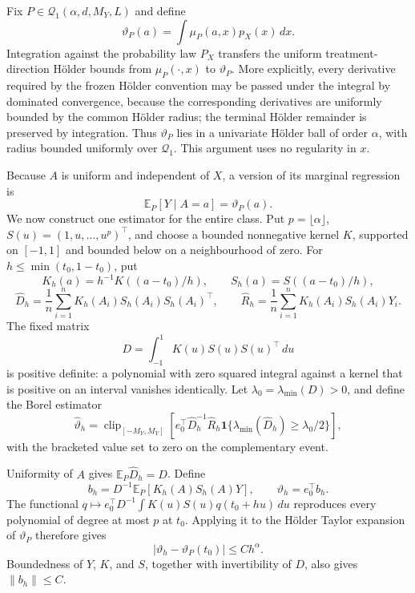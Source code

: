 Fix \(P\in\mathcal Q_1(\alpha,d,M_Y,L)\) and define
\[
\vartheta_P(a)=\int\mu_P(a,x)p_X(x)\,dx.
\]
Integration against the probability law \(P_X\) transfers the uniform treatment-direction H\"older bounds from \(\mu_P(\cdot,x)\) to \(\vartheta_P\). More explicitly, every derivative required by the frozen H\"older convention may be passed under the integral by dominated convergence, because the corresponding derivatives are uniformly bounded by the common H\"older radius; the terminal H\"older remainder is preserved by integration. Thus \(\vartheta_P\) lies in a univariate H\"older ball of order \(\alpha\), with radius bounded uniformly over \(\mathcal Q_1\). This argument uses no regularity in \(x\).

Because \(A\) is uniform and independent of \(X\), a version of its marginal regression is
\[
\mathbb E_P[Y\mid A=a]=\vartheta_P(a).
\]
We now construct one estimator for the entire class. Put \(p=\lfloor\alpha\rfloor\), \(S(u)=(1,u,\ldots,u^p)^\top\), and choose a bounded nonnegative kernel \(K\), supported on \([-1,1]\) and bounded below on a neighbourhood of zero. For \(h\le\min(t_0,1-t_0)\), put
\[
K_h(a)=h^{-1}K((a-t_0)/h),
\qquad
S_h(a)=S((a-t_0)/h),
\]
\[
\widehat D_h=\frac1n\sum_{i=1}^nK_h(A_i)S_h(A_i)S_h(A_i)^\top,
\qquad
\widehat R_h=\frac1n\sum_{i=1}^nK_h(A_i)S_h(A_i)Y_i.
\]
The fixed matrix
\[
D=\int_{-1}^1K(u)S(u)S(u)^\top\,du
\]
is positive definite: a polynomial with zero squared integral against a kernel that is positive on an interval vanishes identically. Let \(\lambda_0=\lambda_{\min}(D)>0\), and define the Borel estimator
\[
\widehat\vartheta_h
=
\operatorname{clip}_{[-M_Y,M_Y]}
\left[
e_0^\top\widehat D_h^{-1}\widehat R_h
\mathbf 1\{\lambda_{\min}(\widehat D_h)\ge\lambda_0/2\}
\right],
\]
with the bracketed value set to zero on the complementary event.

Uniformity of \(A\) gives \(\mathbb E_P\widehat D_h=D\). Define
\[
b_h=D^{-1}\mathbb E_P[K_h(A)S_h(A)Y],
\qquad
\vartheta_h=e_0^\top b_h.
\]
The functional \(q\mapsto e_0^\top D^{-1}\int K(u)S(u)q(t_0+hu)\,du\) reproduces every polynomial of degree at most \(p\) at \(t_0\). Applying it to the H\"older Taylor expansion of \(\vartheta_P\) therefore gives
\[
\lvert\vartheta_h-\vartheta_P(t_0)\rvert\le Ch^\alpha.
\]
Boundedness of \(Y\), \(K\), and \(S\), together with invertibility of \(D\), also gives \(\lVert b_h\rVert\le C\).

